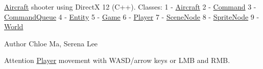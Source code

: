 \mbox{\hyperlink{class_aircraft}{Aircraft}} shooter using DirectX 12 (C++). Classes\+: 1 -\/ \mbox{\hyperlink{class_aircraft}{Aircraft}} 2 -\/ \mbox{\hyperlink{struct_command}{Command}} 3 -\/ \mbox{\hyperlink{class_command_queue}{Command\+Queue}} 4 -\/ \mbox{\hyperlink{class_entity}{Entity}} 5 -\/ \mbox{\hyperlink{class_game}{Game}} 6 -\/ \mbox{\hyperlink{class_player}{Player}} 7 -\/ \mbox{\hyperlink{class_scene_node}{Scene\+Node}} 8 -\/ \mbox{\hyperlink{class_sprite_node}{Sprite\+Node}} 9 -\/ \mbox{\hyperlink{class_world}{World}} \begin{DoxyAuthor}{Author}
Chloe Ma, Serena Lee 
\end{DoxyAuthor}
\begin{DoxyAttention}{Attention}
\mbox{\hyperlink{class_player}{Player}} movement with WASD/arrow keys or LMB and RMB. 
\end{DoxyAttention}
